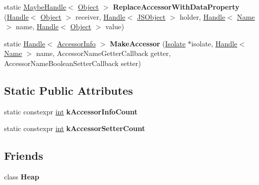 \begin{DoxyCompactItemize}
\item 
\mbox{\label{classv8_1_1internal_1_1Accessors_a468508b79231853f4143946f5b97186d}} 
static \mbox{\hyperlink{classv8_1_1internal_1_1MaybeHandle}{Maybe\+Handle}}$<$ \mbox{\hyperlink{classv8_1_1internal_1_1Object}{Object}} $>$ {\bfseries Replace\+Accessor\+With\+Data\+Property} (\mbox{\hyperlink{classv8_1_1internal_1_1Handle}{Handle}}$<$ \mbox{\hyperlink{classv8_1_1internal_1_1Object}{Object}} $>$ receiver, \mbox{\hyperlink{classv8_1_1internal_1_1Handle}{Handle}}$<$ \mbox{\hyperlink{classv8_1_1internal_1_1JSObject}{J\+S\+Object}} $>$ holder, \mbox{\hyperlink{classv8_1_1internal_1_1Handle}{Handle}}$<$ \mbox{\hyperlink{classv8_1_1internal_1_1Name}{Name}} $>$ name, \mbox{\hyperlink{classv8_1_1internal_1_1Handle}{Handle}}$<$ \mbox{\hyperlink{classv8_1_1internal_1_1Object}{Object}} $>$ value)
\item 
\mbox{\label{classv8_1_1internal_1_1Accessors_a44d62d34f8bb31dc5920f7b8fa2f472e}} 
static \mbox{\hyperlink{classv8_1_1internal_1_1Handle}{Handle}}$<$ \mbox{\hyperlink{classv8_1_1internal_1_1AccessorInfo}{Accessor\+Info}} $>$ {\bfseries Make\+Accessor} (\mbox{\hyperlink{classv8_1_1internal_1_1Isolate}{Isolate}} $\ast$isolate, \mbox{\hyperlink{classv8_1_1internal_1_1Handle}{Handle}}$<$ \mbox{\hyperlink{classv8_1_1internal_1_1Name}{Name}} $>$ name, Accessor\+Name\+Getter\+Callback getter, Accessor\+Name\+Boolean\+Setter\+Callback setter)
\end{DoxyCompactItemize}
\subsection*{Static Public Attributes}
\begin{DoxyCompactItemize}
\item 
static constexpr \mbox{\hyperlink{classint}{int}} {\bfseries k\+Accessor\+Info\+Count}
\item 
static constexpr \mbox{\hyperlink{classint}{int}} {\bfseries k\+Accessor\+Setter\+Count}
\end{DoxyCompactItemize}
\subsection*{Friends}
\begin{DoxyCompactItemize}
\item 
\mbox{\label{classv8_1_1internal_1_1Accessors_a3d69975be2e998e7bf2dcd1b1c8b4577}} 
class {\bfseries Heap}
\end{DoxyCompactItemize}


